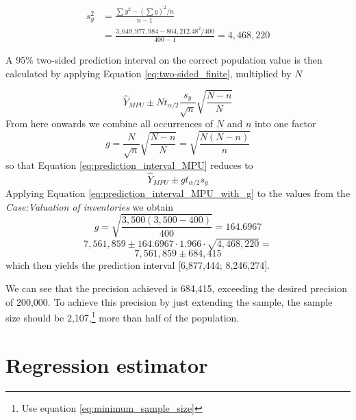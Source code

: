 \begin{align*}
s_y^2 &= \frac{\sum{y^2 - (\sum{y})^2 / n}}{n - 1} \\
&= \frac{3,649,977,984 - 864,212.48^2 / 400}{400 - 1} = 4,468,220
\end{align*}

A 95\% two-sided prediction interval on the correct population value is then calculated by applying Equation \ref{eq:two-sided_finite}, multiplied by $N$

\begin{equation}
  \hat{Y}_{MPU} \pm N t_{\alpha/2} \frac{s_{y}}{\sqrt{n}}\sqrt{\frac{N-n}{N}} 
  \label{eq:prediction_interval_MPU}
\end{equation}
From here onwards we combine all occurrences of $N$ and $n$ into one factor
\begin{equation}
g = \frac{N}{\sqrt{n}}\sqrt{\frac{N - n}{N}} = \sqrt{\frac{N(N - n)}{n}}
\end{equation}
so that Equation \ref{eq:prediction_interval_MPU} reduces to
\begin{equation}
  \hat{Y}_{MPU} \pm g t_{\alpha/2} s_{y}
  \label{eq:prediction_interval_MPU_with_g}
\end{equation}
Applying Equation \ref{eq:prediction_interval_MPU_with_g} to the values from the \emph{Case:Valuation of inventories} we obtain
\begin{equation*}
g = \sqrt{\frac{3,500(3,500 - 400)}{400}} = 164.6967
\end{equation*}
\begin{equation*}
  7,561,859 \pm  164.6967 \cdot 1.966 \cdot \sqrt{4,468,220} = 
\end{equation*}
\begin{equation*}
	7,561,859 \pm 684,415
\end{equation*}
which then yields the prediction interval [6,877,444; 8,246,274]. 

We can see that the precision achieved is 684,415, exceeding the desired precision of 200,000. To achieve this precision by just extending the sample, the sample size should be 2,107,\footnote{Use equation \ref{eq:minimum_sample_size}} more than half of the population.


\section{Regression estimator} %
\label{sec:regression_estimator}

